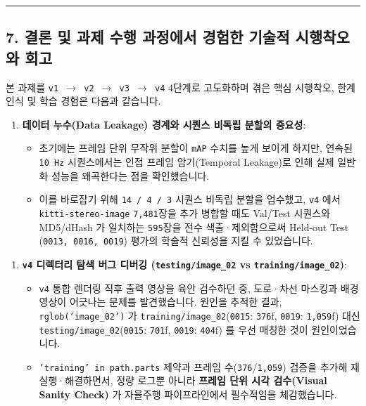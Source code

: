 \documentclass[10.5pt,a4paper]{article}
\begin{document}
\par\noindent\rule{\textwidth}{0.4pt}\par\medskip

\subsection{7. 결론 및 과제 수행 과정에서 경험한 기술적 시행착오와 회고}

본 과제를 \texttt{v1 $\rightarrow$ v2 $\rightarrow$ v3 $\rightarrow$ v4} 4단계로 고도화하며 겪은 핵심 시행착오, 한계 인식 및 학습 경험은 다음과 같습니다.


\begin{enumerate}[leftmargin=1.8em,itemsep=2pt]
\item \textbf{데이터 누수(Data Leakage) 경계와 시퀀스 비독립 분할의 중요성}:
\begin{itemize}[leftmargin=1.5em,itemsep=2pt]
\item 초기에는 프레임 단위 무작위 분할이 \texttt{mAP} 수치를 높게 보이게 하지만, 연속된 \texttt{10 Hz} 시퀀스에서는 인접 프레임 암기(Temporal Leakage)로 인해 실제 일반화 성능을 왜곡한다는 점을 확인했습니다.
\item 이를 바로잡기 위해 \texttt{14 /\allowbreak{} 4 /\allowbreak{} 3} 시퀀스 비독립 분할을 엄수했고, \texttt{v4} 에서 \texttt{kitti-\allowbreak{}stereo-\allowbreak{}image} \texttt{7,\allowbreak{}481}장을 추가 병합할 때도 Val/Test 시퀀스와 MD5/dHash 가 일치하는 \texttt{595}장을 전수 색출·제외함으로써 Held-out Test (\texttt{0013,\allowbreak{} 0016,\allowbreak{} 0019}) 평가의 학술적 신뢰성을 지킬 수 있었습니다.
\end{itemize}
\end{enumerate}

\begin{enumerate}[leftmargin=1.8em,itemsep=2pt]
\item \textbf{\texttt{v4} 디렉터리 탐색 버그 디버깅 (\texttt{testing/\allowbreak{}image\_\allowbreak{}02} vs \texttt{training/\allowbreak{}image\_\allowbreak{}02})}:
\begin{itemize}[leftmargin=1.5em,itemsep=2pt]
\item \texttt{v4} 통합 렌더링 직후 출력 영상을 육안 검수하던 중, 도로·차선 마스킹과 배경 영상이 어긋나는 문제를 발견했습니다. 원인을 추적한 결과, \texttt{rglob('image\_\allowbreak{}02')} 가 \texttt{training/\allowbreak{}image\_\allowbreak{}02}(\texttt{0015}: \texttt{376}f, \texttt{0019}: \texttt{1,\allowbreak{}059}f) 대신 \texttt{testing/\allowbreak{}image\_\allowbreak{}02}(\texttt{0015}: \texttt{701}f, \texttt{0019}: \texttt{404}f) 를 우선 매칭한 것이 원인이었습니다.
\item \texttt{'training' in path.\allowbreak{}parts} 제약과 프레임 수(\texttt{376}/\texttt{1,\allowbreak{}059}) 검증을 추가해 재실행·해결하면서, 정량 로그뿐 아니라 \textbf{프레임 단위 시각 검수(Visual Sanity Check)} 가 자율주행 파이프라인에서 필수적임을 체감했습니다.
\end{itemize}
\end{enumerate}
\end{document}
